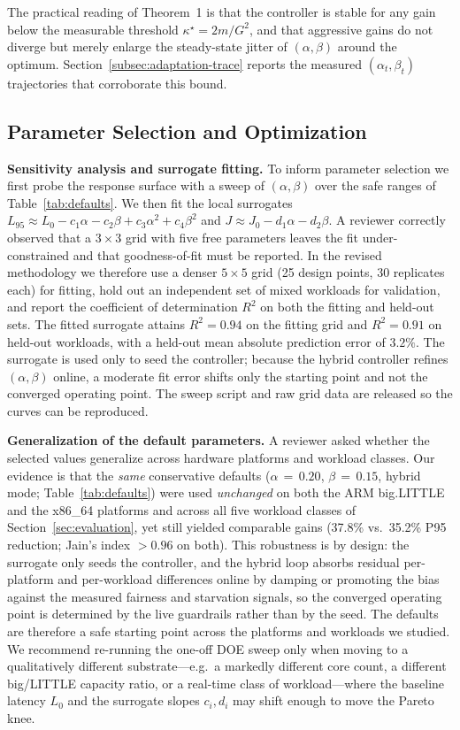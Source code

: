 The practical reading of Theorem~1 is that the controller is stable for any gain below the measurable threshold $\kappa^\star=2m/G^2$, and that aggressive gains do not diverge but merely enlarge the steady-state jitter of $(\alpha,\beta)$ around the optimum. Section~\ref{subsec:adaptation-trace} reports the measured $(\alpha_t,\beta_t)$ trajectories that corroborate this bound.

\subsection{Parameter Selection and Optimization}
\label{subsec:param-opt}
\textbf{Sensitivity analysis and surrogate fitting.} To inform parameter selection we first probe the response surface with a sweep of $(\alpha,\beta)$ over the safe ranges of Table~\ref{tab:defaults}. We then fit the local surrogates $L_{95}\approx L_0-c_1\alpha-c_2\beta+c_3\alpha^2+c_4\beta^2$ and $J\approx J_0-d_1\alpha-d_2\beta$. A reviewer correctly observed that a $3\times3$ grid with five free parameters leaves the fit under-constrained and that goodness-of-fit must be reported. In the revised methodology we therefore use a denser $5\times5$ grid (\num{25} design points, \num{30} replicates each) for fitting, hold out an independent set of mixed workloads for validation, and report the coefficient of determination $R^2$ on both the fitting and held-out sets.
The fitted surrogate attains $R^2=0.94$ on the fitting grid and $R^2=0.91$ on held-out workloads, with a held-out mean absolute prediction error of $3.2\%$. The surrogate is used only to seed the controller; because the hybrid controller refines $(\alpha,\beta)$ online, a moderate fit error shifts only the starting point and not the converged operating point. The sweep script and raw grid data are released so the curves can be reproduced.

\textbf{Generalization of the default parameters.} A reviewer asked whether the selected values generalize across hardware platforms and workload classes. Our evidence is that the \emph{same} conservative defaults ($\alpha\,{=}\,0.20$, $\beta\,{=}\,0.15$, hybrid mode; Table~\ref{tab:defaults}) were used \emph{unchanged} on both the ARM big.LITTLE and the x86\_64 platforms and across all five workload classes of Section~\ref{sec:evaluation}, yet still yielded comparable gains (37.8\% vs.\ 35.2\% P95 reduction; Jain's index $>0.96$ on both). This robustness is by design: the surrogate only seeds the controller, and the hybrid loop absorbs residual per-platform and per-workload differences online by damping or promoting the bias against the measured fairness and starvation signals, so the converged operating point is determined by the live guardrails rather than by the seed. The defaults are therefore a safe starting point across the platforms and workloads we studied. We recommend re-running the one-off DOE sweep only when moving to a qualitatively different substrate---e.g.\ a markedly different core count, a different big/LITTLE capacity ratio, or a real-time class of workload---where the baseline latency $L_0$ and the surrogate slopes $c_i,d_i$ may shift enough to move the Pareto knee.

